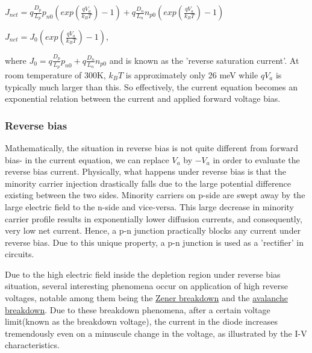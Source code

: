 \documentclass[12 pt]{article}
\begin{document}
\begin{center}
    $ J_{net} = q\frac{D_{p}}{L_{p}}p_{n0}(exp(\frac{qV_{a}}{k_{B}T})-1) + q\frac{D_{n}}{L_{n}}n_{p0}(exp(\frac{qV_{a}}{k_{B}T})-1)  $
\end{center}

\begin{center}
    $ J_{net} = J_{0}(exp(\frac{qV_{a}}{k_{B}T})-1) $,
\end{center}
where $J_{0} = q\frac{D_{p}}{L_{p}}p_{n0} + q\frac{D_{n}}{L_{n}}n_{p0}$ and is known as the 'reverse saturation current'. At room temperature of 300K, $k_{B}T$ is approximately only 26 meV while $qV_{a}$ is typically much larger than this. So effectively, the current equation becomes an exponential relation between the current and applied forward voltage bias. 

\subsubsection{Reverse bias}

Mathematically, the situation in reverse bias is not quite different from forward bias- in the current equation, we can replace $V_{a}$ by $-V_{a}$ in order to evaluate the reverse bias current. Physically, what happens under reverse bias is that the minority carrier injection drastically falls due to the large potential difference existing between the two sides. Minority carriers on p-side are swept away by the large electric field to the n-side and vice-versa. This large decrease in minority carrier profile results in exponentially lower diffusion currents, and consequently, very low net current. Hence, a p-n junction practically blocks any current under reverse bias. Due to this unique property, a p-n junction is used as a 'rectifier' in circuits. \par

Due to the high electric field inside the depletion region under reverse bias situation, several interesting phenomena occur on application of high reverse voltages, notable among them being the \href{https://en.wikipedia.org/wiki/Zener_effect}{Zener breakdown} and the \href{https://en.wikipedia.org/wiki/Avalanche_breakdown#:~:text=Avalanche%20breakdown%20(or%20avalanche%20effect,a%20type%20of%20electron%20avalanche.}{avalanche breakdown}. Due to these breakdown phenomena, after a certain voltage limit(known as the breakdown voltage), the current in the diode increases tremendously even on a minuscule change in the voltage, as illustrated by the I-V characteristics. \par
\end{document}
